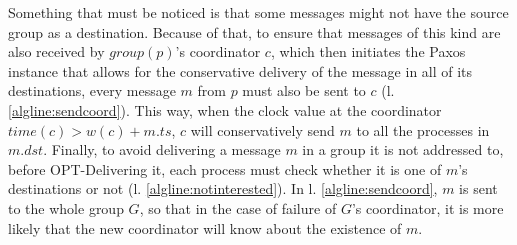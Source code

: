\documentclass[times, 10pt]{article}
\begin{document}
Something that must be noticed is that some messages might not have the source group as a destination. Because of that, to ensure that messages of this kind are also received by $group(p)$'s coordinator $c$, which then initiates the Paxos instance that allows for the conservative delivery of the message in all of its destinations, every message $m$ from $p$ must also be sent to $c$ (l. \ref{algline:sendcoord}). This way, when the clock value at the coordinator $time(c) > w(c) + m.ts$, $c$ will conservatively send $m$ to all the processes in $m.dst$. Finally, to avoid delivering a message $m$ in a group it is not addressed to, before OPT-Delivering it, each process must check whether it is one of $m$'s destinations or not (l. \ref{algline:notinterested}). In l. \ref{algline:sendcoord}, $m$ is sent to the whole group $G$, so that in the case of failure of $G$'s coordinator, it is more likely that the new coordinator will know about the existence of $m$.
\end{document}
